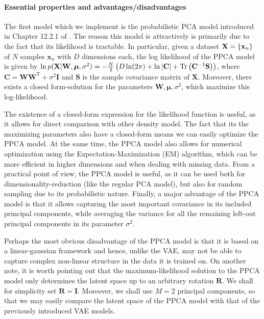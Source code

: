 \paragraph{Essential properties and advantages/disadvantages}
The first model which we implement is the probabilistic PCA model introduced in Chapter 12.2.1 of \citep{bishop2006pattern}. The reason this model is attractively is primarily due to the fact that its likelihood is tractable. In particular, given a dataset $\mathbf{X} = \left \{\mathbf{x}_n\right\}$ of $N$ samples $\mathbf{x}_n$ with $D$ dimensions each, the log likelihood of the PPCA model is given by $\ln p(\mathbf{X}|\mathbf{W}, \bm{\mu}, \sigma^2) = -\frac{N}{2}\left (D \ln(2\pi) + \ln \left |\mathbf{C}\right| + \text{Tr}\left (\mathbf{C}^{-1}\mathbf{S}\right)\right)$, where $\mathbf{C} = \mathbf{W}\mathbf{W}^{\mathsf{T}} + \sigma^2 \mathbf{I}$ and $\mathbf{S}$ is the sample covariance matrix of $\mathbf{X}$. Moreover, there exists a closed form-solution for the parameters $\mathbf{W}, \bm{\mu}, \sigma^2$, which maximize this log-likelihood. 

The existence of a closed-form expression for the likelihood function is useful, as it allows for direct comparison with other density model. The fact that its the maximizing parameters also have a closed-form means we can easily optimize the PPCA model. At the same time, the PPCA model also allows for numerical optimization using the Expectation-Maximization (EM) algorithm, which can be more efficient in higher dimensions and when dealing with missing data. From a practical point of view, the PPCA model is useful, as it can be used both for dimensionality-reduction (like the regular PCA model), but also for random sampling due to its probabilistic nature. Finally, a major advantage of the PPCA model is that it allows capturing the most important covariance in its included principal components, while averaging the variance for all the remaining left-out principal components in its parameter $\sigma^2$. 

Perhaps the most obvious disadvantage of the PPCA model is that it is based on a linear-gaussian framework and hence, unlike the VAE, may not be able to capture complex non-linear structure in the data it is trained on. On another note, it is worth pointing out that the maximum-likelihood solution to the PPCA model only determines the latent space up to an arbitrary rotation $\mathbf{R}$. We shall for simplicity set $\mathbf{R} = \mathbf{I}$. Moreover, we shall use $M=2$ principal components, so that we may easily compare the latent space of the PPCA model with that of the previously introduced VAE models.

